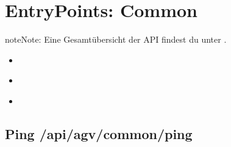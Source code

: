 \documentclass[letterpaper,10pt,english]{sphinxmanual}
\begin{document}
\sphinxstepscope


\chapter{Entry\sphinxhyphen{}Points: Common}
\label{\detokenize{agv_rest_api_common:entry-points-common}}\label{\detokenize{agv_rest_api_common::doc}}
\begin{sphinxadmonition}{note}{Note:}
\sphinxAtStartPar
Eine Gesamtübersicht der API findest du unter {\hyperref[\detokenize{index::doc}]{}}.
\end{sphinxadmonition}

\sphinxAtStartPar
{}
\begin{itemize}
\item {} 
\sphinxAtStartPar
{\hyperref[\detokenize{agv_rest_api_common:get-api-agv-common-ping}]{}}

\item {} 
\sphinxAtStartPar
{\hyperref[\detokenize{agv_rest_api_common:post-api-agv-common-identify}]{}}

\item {} 
\sphinxAtStartPar
{\hyperref[\detokenize{agv_rest_api_common:post-api-agv-common-restart}]{}}

\end{itemize}


\section{Ping \sphinxhyphen{} /api/agv/common/ping}
\label{\detokenize{agv_rest_api_common:ping-api-agv-common-ping}}\label{\detokenize{agv_rest_api_common:get-api-agv-common-ping}}
\end{document}
